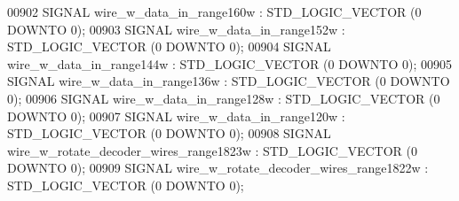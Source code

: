 \begin{DoxyCode}
{00902      \textcolor{keywordflow}{SIGNAL}  \textcolor{vhdlchar}{wire_w_data_in_range160w}   \textcolor{vhdlchar}{:}   \textcolor{comment}{STD\_LOGIC\_VECTOR} \textcolor{vhdlchar}{(}\textcolor{vhdllogic}{}\textcolor{vhdllogic}{0} \textcolor{keywordflow}{DOWNTO} \textcolor{vhdllogic}{}\textcolor{vhdllogic}{0}\textcolor{vhdlchar}{)};
00903      \textcolor{keywordflow}{SIGNAL}  \textcolor{vhdlchar}{wire_w_data_in_range152w}   \textcolor{vhdlchar}{:}   \textcolor{comment}{STD\_LOGIC\_VECTOR} \textcolor{vhdlchar}{(}\textcolor{vhdllogic}{}\textcolor{vhdllogic}{0} \textcolor{keywordflow}{DOWNTO} \textcolor{vhdllogic}{}\textcolor{vhdllogic}{0}\textcolor{vhdlchar}{)};
00904      \textcolor{keywordflow}{SIGNAL}  \textcolor{vhdlchar}{wire_w_data_in_range144w}   \textcolor{vhdlchar}{:}   \textcolor{comment}{STD\_LOGIC\_VECTOR} \textcolor{vhdlchar}{(}\textcolor{vhdllogic}{}\textcolor{vhdllogic}{0} \textcolor{keywordflow}{DOWNTO} \textcolor{vhdllogic}{}\textcolor{vhdllogic}{0}\textcolor{vhdlchar}{)};
00905      \textcolor{keywordflow}{SIGNAL}  \textcolor{vhdlchar}{wire_w_data_in_range136w}   \textcolor{vhdlchar}{:}   \textcolor{comment}{STD\_LOGIC\_VECTOR} \textcolor{vhdlchar}{(}\textcolor{vhdllogic}{}\textcolor{vhdllogic}{0} \textcolor{keywordflow}{DOWNTO} \textcolor{vhdllogic}{}\textcolor{vhdllogic}{0}\textcolor{vhdlchar}{)};
00906      \textcolor{keywordflow}{SIGNAL}  \textcolor{vhdlchar}{wire_w_data_in_range128w}   \textcolor{vhdlchar}{:}   \textcolor{comment}{STD\_LOGIC\_VECTOR} \textcolor{vhdlchar}{(}\textcolor{vhdllogic}{}\textcolor{vhdllogic}{0} \textcolor{keywordflow}{DOWNTO} \textcolor{vhdllogic}{}\textcolor{vhdllogic}{0}\textcolor{vhdlchar}{)};
00907      \textcolor{keywordflow}{SIGNAL}  \textcolor{vhdlchar}{wire_w_data_in_range120w}   \textcolor{vhdlchar}{:}   \textcolor{comment}{STD\_LOGIC\_VECTOR} \textcolor{vhdlchar}{(}\textcolor{vhdllogic}{}\textcolor{vhdllogic}{0} \textcolor{keywordflow}{DOWNTO} \textcolor{vhdllogic}{}\textcolor{vhdllogic}{0}\textcolor{vhdlchar}{)};
00908      \textcolor{keywordflow}{SIGNAL}  \textcolor{vhdlchar}{wire_w_rotate_decoder_wires_range1823w} \textcolor{vhdlchar}{:}   \textcolor{comment}{STD\_LOGIC\_VECTOR} \textcolor{vhdlchar}{(}\textcolor{vhdllogic}{}\textcolor{vhdllogic}{0} \textcolor{keywordflow}{DOWNTO} \textcolor{vhdllogic}{}\textcolor{vhdllogic}{0}\textcolor{vhdlchar}{)};
00909      \textcolor{keywordflow}{SIGNAL}  \textcolor{vhdlchar}{wire_w_rotate_decoder_wires_range1822w} \textcolor{vhdlchar}{:}   \textcolor{comment}{STD\_LOGIC\_VECTOR} \textcolor{vhdlchar}{(}\textcolor{vhdllogic}{}\textcolor{vhdllogic}{0} \textcolor{keywordflow}{DOWNTO} \textcolor{vhdllogic}{}\textcolor{vhdllogic}{0}\textcolor{vhdlchar}{)};
}
\end{DoxyCode}
